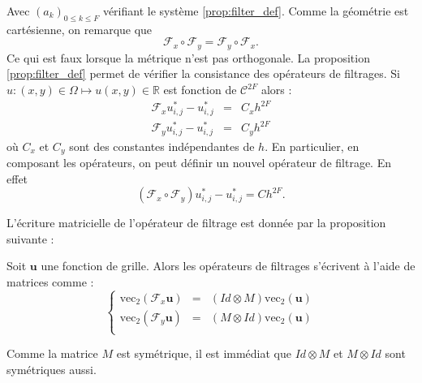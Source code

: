 Avec $(a_k)_{0 \leq k \leq F}$ vérifiant le système \eqref{prop:filter_def}. Comme la géométrie est cartésienne, on remarque que 
\begin{equation}
\mathcal{F}_x \circ \mathcal{F}_y = \mathcal{F}_y \circ \mathcal{F}_x.
\end{equation}
Ce qui est faux lorsque la métrique n'est pas orthogonale.
La proposition \ref{prop:filter_def} permet de vérifier la consistance des opérateurs de filtrages.
Si $u : (x,y) \in \Omega \mapsto u(x,y) \in \mathbb{R}$ est fonction de $\mathcal{C}^{2F}$ alors :
\begin{eqnarray*}
\mathcal{F}_x u^*_{i,j} - u^*_{i,j} & = & C_xh^{2F}\\
\mathcal{F}_y u^*_{i,j} - u^*_{i,j} & = & C_yh^{2F}
\end{eqnarray*}
où $C_x$ et $C_y$ sont des constantes indépendantes de $h$.
En particulier, en composant les opérateurs, on peut définir un nouvel opérateur de filtrage. En effet  
\begin{equation}
(\mathcal{F}_x \circ \mathcal{F}_y) u_{i,j}^* - u_{i,j}^* = Ch^{2F}.
\end{equation}

L'écriture matricielle de l'opérateur de filtrage est donnée par la proposition suivante :
\begin{proposition}
Soit $\mathbf{u}$ une fonction de grille. Alors les opérateurs de filtrages s'écrivent à l'aide de matrices comme :
\begin{equation}
\left\lbrace
\begin{array}{rcl}
\text{vec}_2 (\mathcal{F}_x \mathbf{u}) & = & (Id \otimes M) \text{vec}_2 (\mathbf{u})\\
\text{vec}_2 (\mathcal{F}_y \mathbf{u}) & = & (M \otimes Id) \text{vec}_2 (\mathbf{u})\\
\end{array}
\right.
\end{equation}
\end{proposition}
Comme la matrice $M$ est symétrique, il est immédiat que $Id \otimes M$ et $M \otimes Id$ sont symétriques aussi.